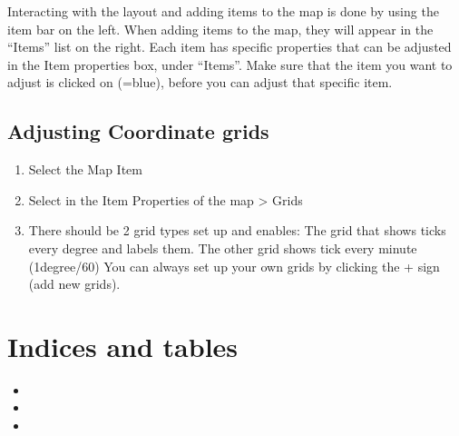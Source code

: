 \documentclass[letterpaper,10pt,english]{sphinxmanual}
\begin{document}
\sphinxAtStartPar
Interacting with the layout and adding items to the map is done by using the item bar on the left. When adding items to the map, they will appear in the “Items” list on the right. Each item has specific properties that can be adjusted in the Item properties box, under “Items”. Make sure that the item you want to adjust is clicked on (=blue), before you can adjust that specific item.




\section{Adjusting Coordinate grids}
\label{\detokenize{06_cartography:adjusting-coordinate-grids}}\begin{enumerate}
%
\item {} 
\sphinxAtStartPar
Select the Map Item

\item {} 
\sphinxAtStartPar
Select in the Item Properties of the map \sphinxhyphen{}\textgreater{} Grids

\item {} 
\sphinxAtStartPar
There should be 2 grid types set up and enables: The grid that shows ticks every degree and labels them. The other grid shows tick every minute (1degree/60) You can always set up your own grids by clicking the + sign (add new grids).



\end{enumerate}


\chapter{Indices and tables}
\label{\detokenize{index:indices-and-tables}}\begin{itemize}
\item {} 
\sphinxAtStartPar
{}

\item {} 
\sphinxAtStartPar
{}

\item {} 
\sphinxAtStartPar
{}

\end{itemize}



\renewcommand{\indexname}{Index}
\printindex
\end{document}
